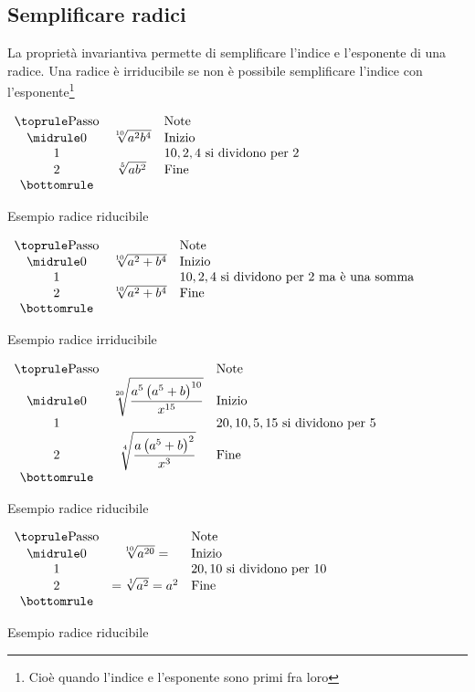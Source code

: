 \subsection{Semplificare radici}
\label{sec:RadiciIriducibili}
La proprietà invariantiva permette di semplificare l'indice e l'esponente  di una radice.
Una radice è irriducibile se non è possibile semplificare l'indice con l'esponente\footnote{Cioè quando l'indice e l'esponente sono primi fra loro}
\begin{table}[H]
\centering
$
\begin{array}{ccl}
\toprule
\text{Passo} &  & \text{Note} \\ 
\midrule
0 &\sqrt[10]{a^2b^4} & \text{Inizio} \\ 
1 &  &  10,2,4 \text{ si dividono per }2\\ 
2 &\sqrt[5]{ab^2}  &\text{Fine}\\
\bottomrule
\end{array} 
$
\label{Tab:radiceriducibile}
\caption{Esempio radice riducibile}
\end{table}
\begin{table}[H]
\centering
$
\begin{array}{ccl}
\toprule
\text{Passo} &  & \text{Note} \\ 
\midrule
0 &\sqrt[10]{a^2+b^4} & \text{Inizio} \\ 
1 &  &  10,2,4 \text{ si dividono per }2 \text{ ma è una somma}\\ 
2 &\sqrt[10]{a^2+b^4}  &\text{Fine}\\
\bottomrule
\end{array} 
$
\label{Tab:radiceriducibilece}
\caption{Esempio radice irriducibile}
\end{table}
\begin{table}[H]
\centering
$
\begin{array}{ccl}
\toprule
\text{Passo} &  & \text{Note} \\ 
\midrule
0 &\sqrt[20]{\dfrac{a^5\left( a^5+b\right)^{10} }{x^{15}}} & \text{Inizio} \\ 
1 &  &  20,10,5,15 \text{ si dividono per }5 \\ 
2 &\sqrt[4]{\dfrac{a\left( a^5+b\right)^{2} }{x^{3}}} & \text{Fine} \\ 
\bottomrule
\end{array} 
$
\label{Tab:radiceriducibilece2}
\caption{Esempio radice riducibile}
\end{table}
\begin{table}[H]
\centering
$
\begin{array}{ccl}
\toprule
\text{Passo} &  & \text{Note} \\ 
\midrule
0 &\sqrt[10]{a^{20}}= & \text{Inizio} \\ 
1 &  &  20,10 \text{ si dividono per }10 \\ 
2 &=\sqrt[1]{a^2}=a^2 & \text{Fine} \\ 
\bottomrule
\end{array} 
$
\label{Tab:radiceriducibilece3}
\caption{Esempio radice riducibile}
\end{table}
